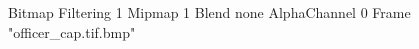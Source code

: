{Bitmap
	{Filtering 1}
	{Mipmap 1}
	{Blend none}
	{AlphaChannel 0}
	{Frame "officer_cap.tif.bmp"}
}
